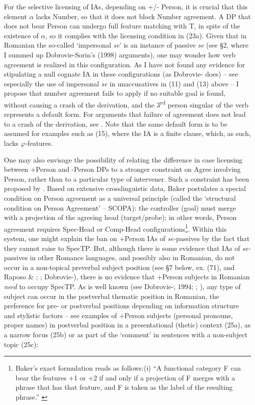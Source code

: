 \documentclass[output=paper]{langsci/langscibook}
\begin{document}
For the selective licensing of IAs, depending on +/- Person, it is crucial that this element $\alpha $ lacks Number, so that it does not block Number agreement. A DP that does not bear Person can undergo full feature matching with T, in spite of the existence of $\alpha $, so it complies with the licensing condition in (23a). Given that in Romanian the so-called ‘impersonal \textit{se}’ is an instance of passive \textit{se} (see §2, where I summed up Dobrovie-Sorin’s (1998) arguments), one may wonder how verb agreement is realized in this configuration. As I have not found any evidence for stipulating a null cognate IA in these configurations (as Dobrovie-\citealt{Sorin1998} does) – see especially the use of impersonal \textit{se} in unaccusatives in (11) and (13) above – I propose that number agreement fails to apply if no suitable goal is found, without causing a crash of the derivation, and the 3\textsuperscript{rd} person singular of the verb represents a default form. For arguments that failure of agreement does not lead to a crash of the derivation, see \citet{Preminger2014}. Note that the same default form is to be assumed for examples such as (15), where the IA is a finite clause, which, as such, lacks $\varphi $-features.

One may also envisage the possibility of relating the difference in case licensing between +Person and -Person DPs to a stronger constraint on Agree involving Person, rather than to a particular type of intervener. Such a constraint has been proposed by \citet{Baker2008}. Based on extensive crosslinguistic data, Baker postulates a special condition on Person agreement as a universal principle (called the ‘structural condition on Person Agreement’ – SCOPA): the controller (goal) must merge with a projection of the agreeing head (target/probe); in other words, Person agreement requires Spec-Head or Comp-Head configurations\footnote{Baker’s exact formulation reads as follows:(i)  “A functional category F can bear the features +1 or +2 if and only if a projection of F merges with a phrase that has that feature, and F is taken as the label of the resulting phrase.” \citep[52]{Baker2008}}. Within this system, one might explain the ban on +Person IAs of \textit{se-}passives by the fact that they cannot raise to SpecTP. But, although there is some evidence that IAs of \textit{se-}passives in other Romance languages, and possibly also in Romanian, do not occur in a non-topical preverbal subject position (see §7 below, ex. (71), and Raposo \& \citealt{Uriagereka1996}; \citealt{Cornilescu1998}; Dobrovie-\citealt{Sorin2006}), there is no evidence that +Person subjects in Romanian \textit{need} to occupy SpecTP. As is well known (see Dobrovie-\citealt{Sorin1987}; 1994; \citealt{Cornilescu1997}; \citealt{Alboiu2002}), any type of subject can occur in the postverbal thematic position in Romanian, the preference for pre- or postverbal positions depending on information structure and stylistic factors – see examples of +Person subjects (personal pronouns, proper names) in postverbal position in a presentational (thetic) context (25a), as a narrow focus (25b) or as part of the ‘comment’ in sentences with a non-subject topic (25c):
\end{document}
